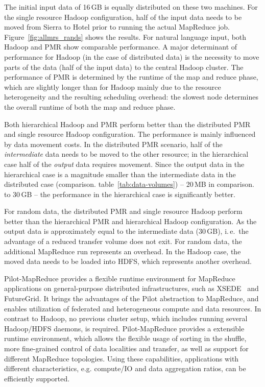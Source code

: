 \documentclass[]{paper}
\begin{document}
The initial input data of 16\,GB is equally distributed on these two machines. For the single resource Hadoop configuration, half of the input data needs to be moved from
Sierra to Hotel prior to running the actual MapReduce
job.  Figure~\ref{fig:allmrs_rands} shows the results. For natural language
input, both Hadoop and PMR show comparable performance. A major
determinant of performance for Hadoop (in the case of distributed
data) is the necessity to move parts of the data (half of the input
data) to the central Hadoop cluster. The performance of PMR is
determined by the runtime of the map and reduce phase, which are
slightly longer than for Hadoop mainly due to the resource
heterogeneity and the resulting scheduling overhead: the slowest node
determines the overall runtime of both the map and reduce phase.

Both hierarchical Hadoop and PMR perform better than
the distributed PMR and single resource Hadoop configuration. The
performance is mainly influenced by data movement costs. In the
distributed PMR scenario, half of the {\it intermediate} data needs to
be moved to the other resource; in the hierarchical case half of the
{\it output} data requires movement. Since the output data in the
hierarchical case is a magnitude smaller than the intermediate data in
the distributed case (comparison. table~\ref{tab:data-volumes}) -- 20\,MB in
comparison. to 30\,GB -- the performance in the hierarchical case is
significantly better.

For random data, the distributed PMR and single resource Hadoop
perform better than the hierarchical PMR and hierarchical Hadoop
configuration. As the output data is approximately equal to the
intermediate data (30\,GB), i.\,e.\ the advantage of a reduced
transfer volume does not exit. For random data, the additional
MapReduce run represents an overhead. In the Hadoop case, the moved
data needs to be loaded into HDFS, which represents another overhead.



Pilot-MapReduce provides a flexible runtime environment for MapReduce applications on general-purpose distributed infrastructures, such as XSEDE~\cite{xsede} and FutureGrid. It brings the advantages of the Pilot abstraction to MapReduce, and enables utilization of federated and heterogeneous compute and data resources. In contrast to Hadoop, no previous cluster setup, which includes running several Hadoop/HDFS daemons, is required. Pilot-MapReduce provides a extensible runtime environment, which allows the flexible usage of sorting in the shuffle, more fine-grained control of data localities and transfer, as well as support for different MapReduce topologies. Using these capabilities, applications with different characteristics, e.g. compute/IO and data aggregation ratios, can be efficiently supported.
\end{document}
